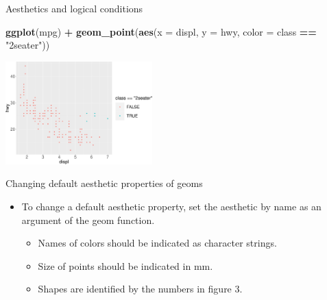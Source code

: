 \documentclass[ignorenonframetext,]{beamer}
\newenvironment{Shaded}{\begin{snugshade}}{\end{snugshade}}
\newcommand{\DataTypeTok}[1]{\textcolor[rgb]{0.13,0.29,0.53}{#1}}
\newcommand{\KeywordTok}[1]{\textcolor[rgb]{0.13,0.29,0.53}{\textbf{#1}}}
\newcommand{\NormalTok}[1]{#1}
\newcommand{\OperatorTok}[1]{\textcolor[rgb]{0.81,0.36,0.00}{\textbf{#1}}}
\newcommand{\StringTok}[1]{\textcolor[rgb]{0.31,0.60,0.02}{#1}}
\begin{document}
\begin{frame}[fragile]{Aesthetics and logical conditions}
\protect\hypertarget{aesthetics-and-logical-conditions-2}{}

\begin{Shaded}
\begin{Highlighting}[]
\KeywordTok{ggplot}\NormalTok{(mpg) }\OperatorTok{+}\StringTok{ }
\StringTok{  }\KeywordTok{geom_point}\NormalTok{(}\KeywordTok{aes}\NormalTok{(}\DataTypeTok{x =}\NormalTok{ displ, }\DataTypeTok{y =}\NormalTok{ hwy, }
                 \DataTypeTok{color =}\NormalTok{ class }\OperatorTok{==}\StringTok{ "2seater"}\NormalTok{))}
\end{Highlighting}
\end{Shaded}

\begin{center}\includegraphics[height=150px]{data-visualization_files/figure-beamer/unnamed-chunk-37-1} \end{center}

\end{frame}

\begin{frame}{Changing default aesthetic properties of geoms}
\protect\hypertarget{changing-default-aesthetic-properties-of-geoms}{}

\begin{itemize}
\item
  To change a default aesthetic property, set the aesthetic by name as
  an argument of the geom function.

  \begin{itemize}
  \item
    Names of colors should be indicated as character strings.
  \item
    Size of points should be indicated in mm.
  \item
    Shapes are identified by the numbers in figure 3.
  \end{itemize}
\end{itemize}

\end{frame}
\end{document}
